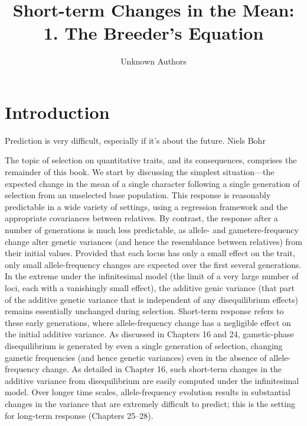\documentclass{article}
\title{Short-term Changes in the Mean:
1. The Breeder's Equation}
\author{Unknown Authors}
\date{}
\begin{document}
\maketitle

\begin{abstract}

\end{abstract}

\section{Introduction}
Prediction is very difficult, especially if it's about the future. Niels Bohr

The topic of selection on quantitative traits, and its consequences, comprises the remainder of this book. We start by discussing the simplest situation—the expected change in the mean of a single character following a single generation of selection from an unselected base population. This response is reasonably predictable in a wide variety of settings, using a regression framework and the appropriate covariances between relatives. By contrast, the response after a number of generations is much less predictable, as allele- and gametere-frequency change alter genetic variances (and hence the resemblance between relatives) from their initial values. Provided that each locus has only a small effect on the trait, only small allele-frequency changes are expected over the first several generations. In the extreme under the infinitesimal model (the limit of a very large number of loci, each with a vanishingly small effect), the additive genic variance (that part of the additive genetic variance that is independent of any disequilibrium effects) remains essentially unchanged during selection. Short-term response refers to these early generations, where allele-frequency change has a negligible effect on the initial additive variance. As discussed in Chapters 16 and 24, gametic-phase disequilibrium is generated by even a single generation of selection, changing gametic frequencies (and hence genetic variances) even in the absence of allele-frequency change. As detailed in Chapter 16, such short-term changes in the additive variance from disequilibrium are easily computed under the infinitesimal model. Over longer time scales, allele-frequency evolution results in substantial changes in the variance that are extremely difficult to predict; this is the setting for long-term response (Chapters 25–28).
\end{document}

